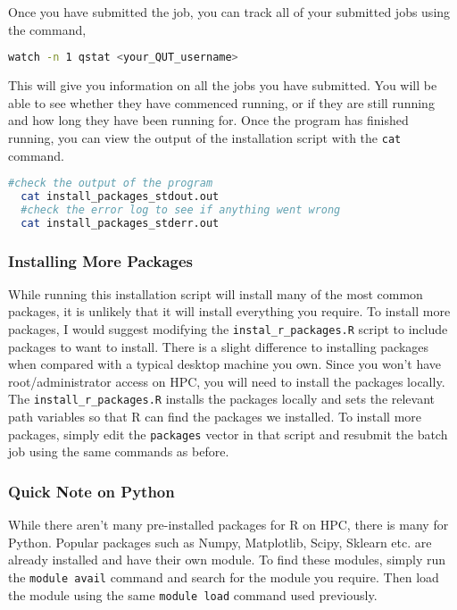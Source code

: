 %
%
Once you have submitted the job, you can track all of your submitted jobs using the command,
%
\begin{lstlisting}[language=bash, frame=single]
  watch -n 1 qstat <your_QUT_username>
\end{lstlisting}
%
%
This will give you information on all the jobs you have submitted. You will be able to see whether they have commenced running, or if they are still running and how long they have been running for. Once the program has finished running, you can view the output of the installation script with the \texttt{cat} command.
\begin{lstlisting}[language=bash, frame=single]
  #check the output of the program
  cat install_packages_stdout.out
  #check the error log to see if anything went wrong
  cat install_packages_stderr.out
\end{lstlisting}
%
%
%
\subsubsection{Installing More Packages}
%
%
While running this installation script will install many of the most common packages, it is unlikely that it will install everything you require. To install more packages, I would suggest modifying the \texttt{instal\_r\_packages.R} script to include packages to want to install. There is a slight difference to installing packages when compared with a typical desktop machine you own. Since you won't have root/administrator access on HPC, you will need to install the packages locally. The \texttt{install\_r\_packages.R} installs the packages locally and sets the relevant path variables so that R can find the packages we installed. To install more packages, simply edit the \texttt{packages} vector in that script and resubmit the batch job using the same commands as before.
%
%
\subsubsection{Quick Note on Python}
%
%
While there aren't many pre-installed packages for R on HPC, there is many for Python. Popular packages such as Numpy, Matplotlib, Scipy, Sklearn etc. are already installed and have their own module. To find these modules, simply run the \texttt{module avail} command and search for the module you require. Then load the module using the same \texttt{module load} command used previously.
%
%
%
